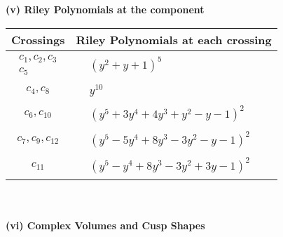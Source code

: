 \documentclass[1p]{elsarticle_modified}
\theoremstyle{definition}
\begin{document}
\newpage\renewcommand{\arraystretch}{1}
\flushleft \textbf{(v) Riley Polynomials at the component}\newline \\
\begin{tabular}{m{50pt}|m{274pt}}
Crossings & \hspace{64pt}Riley Polynomials at each crossing \\
\hline $$\begin{aligned}c_{1},c_{2},c_{3}\\c_{5}\end{aligned}$$&$\begin{aligned}
&(y^2+y+1)^5
\end{aligned}$\\
\hline $$\begin{aligned}c_{4},c_{8}\end{aligned}$$&$\begin{aligned}
&y^{10}
\end{aligned}$\\
\hline $$\begin{aligned}c_{6},c_{10}\end{aligned}$$&$\begin{aligned}
&(y^5+3 y^4+4 y^3+y^2- y-1)^2
\end{aligned}$\\
\hline $$\begin{aligned}c_{7},c_{9},c_{12}\end{aligned}$$&$\begin{aligned}
&(y^5-5 y^4+8 y^3-3 y^2- y-1)^2
\end{aligned}$\\
\hline $$\begin{aligned}c_{11}\end{aligned}$$&$\begin{aligned}
&(y^5- y^4+8 y^3-3 y^2+3 y-1)^2
\end{aligned}$\\
\hline
\end{tabular}\\~\\
\newpage\flushleft \textbf{(vi) Complex Volumes and Cusp Shapes}
\end{document}

